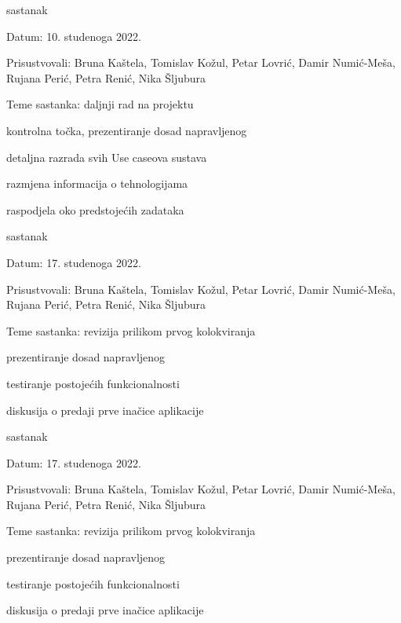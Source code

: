 \begin{packed_enum}
			\item  sastanak
			\item[] \begin{packed_item}
				\item Datum: 10. studenoga 2022. 
				\item Prisustvovali: Bruna Kaštela, Tomislav Kožul, Petar Lovrić, Damir Numić-Meša, Rujana Perić, Petra Renić, Nika Šljubura
				\item Teme sastanka: daljnji rad na projektu
				\begin{packed_item}
					\item  kontrolna točka, prezentiranje dosad napravljenog
					\item  detaljna razrada svih Use caseova sustava
                    \item  razmjena informacija o tehnologijama
                    \item  raspodjela oko predstojećih zadataka

				\end{packed_item}
			\end{packed_item}

            \item  sastanak
			\item[] \begin{packed_item}
				\item Datum: 17. studenoga 2022. 
				\item Prisustvovali: Bruna Kaštela, Tomislav Kožul, Petar Lovrić, Damir Numić-Meša, Rujana Perić, Petra Renić, Nika Šljubura
				\item Teme sastanka: revizija prilikom prvog kolokviranja
				\begin{packed_item}
					\item  prezentiranje dosad napravljenog
					\item  testiranje postojećih funkcionalnosti
                    \item  diskusija o predaji prve inačice aplikacije

				\end{packed_item}
			\end{packed_item}

            \item  sastanak
			\item[] \begin{packed_item}
				\item Datum: 17. studenoga 2022. 
				\item Prisustvovali: Bruna Kaštela, Tomislav Kožul, Petar Lovrić, Damir Numić-Meša, Rujana Perić, Petra Renić, Nika Šljubura
				\item Teme sastanka: revizija prilikom prvog kolokviranja
				\begin{packed_item}
					\item  prezentiranje dosad napravljenog
					\item  testiranje postojećih funkcionalnosti
                    \item  diskusija o predaji prve inačice aplikacije


\end{packed_item}
\end{packed_item}
\end{packed_enum}
